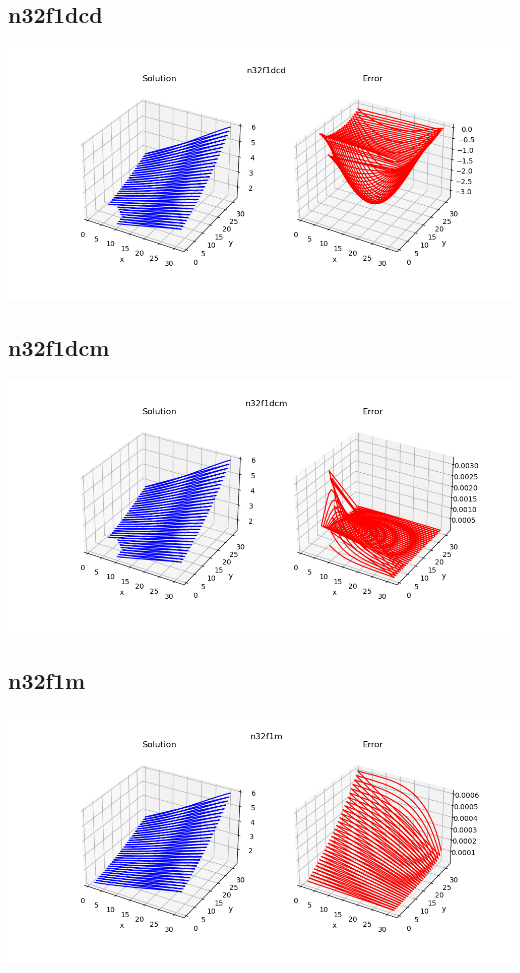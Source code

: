 \subsection*{n32f1dcd}
\includegraphics[scale=0.6]{../../image/n32f1dcd.png}
\subsection*{n32f1dcm}
\includegraphics[scale=0.6]{../../image/n32f1dcm.png}
\subsection*{n32f1m}
\includegraphics[scale=0.6]{../../image/n32f1m.png}
